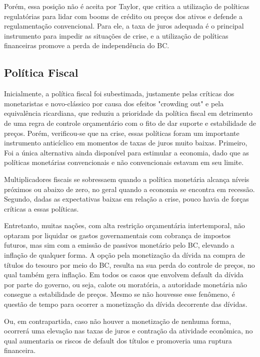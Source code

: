 \documentclass[report]{uftex}
\begin{document}
Porém, essa posição não é aceita por Taylor, que critica a utilização de políticas regulatórias para lidar com booms de crédito ou preços dos ativos e defende a regulamentação convencional. Para ele, a taxa de juros adequada é o principal instrumento para impedir as situações de crise, e a utilização de políticas financeiras promove a perda de independência do BC.

\subsection{Política Fiscal}

Inicialmente, a política fiscal foi subestimada, justamente pelas críticas dos monetaristas e novo-clássico por causa dos efeitos "crowding out" e pela equivalência ricardiana, que reduziu a prioridade da política fiscal em detrimento de uma regra de controle orçamentário com o fito de dar suporte e estabilidade de preços. Porém, verificou-se que na crise, essas políticas foram um importante instrumento anticíclico em momentos de taxas de juros muito baixas. Primeiro, Foi a única alternativa ainda disponível para estimular a economia, dado que as políticas monetárias convencionais e não convencionais estavam em seu limite.  

Multiplicadores fiscais se sobressaem quando a política monetária alcança níveis próximos ou abaixo de zero, no geral quando a economia se encontra em recessão. Segundo, dadas as expectativas baixas em relação a crise, pouco havia de forças críticas a essas políticas.

Entretanto, muitas nações, com alta restrição orçamentária intertemporal, não optaram por liquidar os gastos governamentais com cobrança de impostos futuros, mas sim com a emissão de passivos monetário pelo BC, elevando a inflação de qualquer forma. A opção pela monetização da dívida na compra de títulos do tesouro por meio do BC, resulta na sua perda do controle de preços, no qual também gera inflação. Em todos os casos que envolvem default da dívida por parte do governo, ou seja, calote ou moratória, a autoridade monetária não consegue a estabilidade de preços. Mesmo se não houvesse esse fenômeno, é questão de tempo para ocorrer a monetização da dívida decorrente das dívidas.

Ou, em contrapartida, caso não houver a monetização de nenhuma forma, ocorrerá uma elevação nas taxas de juros e contração da atividade econômica, no qual aumentaria os riscos de default dos títulos e promoveria uma ruptura financeira. %
\end{document}
